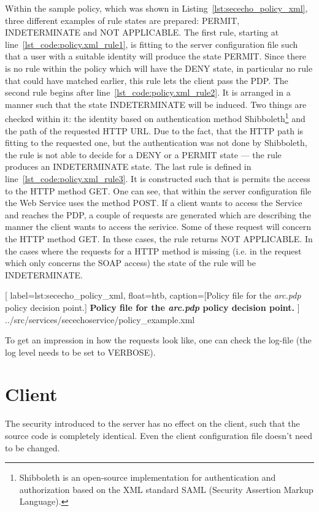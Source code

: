 Within the sample policy, which was shown in Listing~\ref{lst:sececho_policy_xml}, three different examples of rule states are prepared: PERMIT, INDETERMINATE and NOT APPLICABLE.
The first rule, starting at line~\ref{lst_code:policy.xml_rule1}, is fitting to the server configuration file such that a user with a suitable identity will produce the state PERMIT. 
Since there is no rule within the policy which will have the DENY state, in particular no rule that could have matched earlier, this rule lets the client pass the PDP.
The second rule begins after line~\ref{lst_code:policy.xml_rule2}. It is arranged in a manner such that the state INDETERMINATE will be induced. Two things are checked within it: the identity based on authentication method Shibboleth\footnote{Shibboleth is an open-source implementation for authentication and authorization based on the XML standard SAML (Security Assertion Markup Language).} 
and the path of the requested HTTP URL. Due to the fact, that the HTTP path is fitting to the requested one, but the authentication was not done by Shibboleth, the rule is not able to decide for a DENY or a PERMIT state --- the rule produces an INDETERMINATE state.
The last rule is defined in line~\ref{lst_code:policy.xml_rule3}. It is constructed such that is permits the access to the HTTP method GET. 
One can see, that within the server configuration file the Web Service uses the method POST. If a client wants to access the Service and reaches the PDP, a couple of requests are generated which are describing the manner the client wants to access the serivice. Some of these request will concern the HTTP method GET. In these cases, the rule returns NOT APPLICABLE. In the cases where the requests for a HTTP method is missing (i.e. in the request which only concerns the SOAP access) the state of the rule will be INDETERMINATE.\\

	[
	label=lst:sececho_policy_xml, float=htb,
	caption={[Policy file for the \textit{arc.pdp} policy decision point.]
	\textbf{Policy file for the \textit{arc.pdp} policy decision point.}}
	]
{../src/services/secechoservice/policy_example.xml}


To get an impression in how the requests look like, one can check the log-file (the log level needs to be set to VERBOSE).


\section{Client}

The security introduced to the server has no effect on the client, such that the source code is completely identical. Even the client configuration file doesn't need to be changed.
















